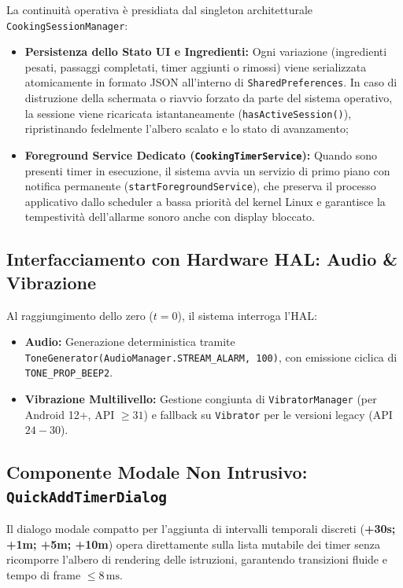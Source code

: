 \documentclass[11pt,a4paper,titlepage]{article}
\begin{document}
La continuit\`a operativa \`e presidiata dal singleton architetturale \texttt{CookingSessionManager}:
\begin{itemize}[leftmargin=*]
    \item \textbf{Persistenza dello Stato UI e Ingredienti:} Ogni variazione (ingredienti pesati, passaggi completati, timer aggiunti o rimossi) viene serializzata atomicamente in formato JSON all'interno di \texttt{SharedPreferences}. In caso di distruzione della schermata o riavvio forzato da parte del sistema operativo, la sessione viene ricaricata istantaneamente (\texttt{hasActiveSession()}), ripristinando fedelmente l'albero scalato e lo stato di avanzamento;
    \item \textbf{Foreground Service Dedicato (\texttt{CookingTimerService}):} Quando sono presenti timer in esecuzione, il sistema avvia un servizio di primo piano con notifica permanente (\texttt{startForegroundService}), che preserva il processo applicativo dallo scheduler a bassa priorit\`a del kernel Linux e garantisce la tempestivit\`a dell'allarme sonoro anche con display bloccato.
\end{itemize}

\subsection{Interfacciamento con Hardware HAL: Audio \& Vibrazione}
Al raggiungimento dello zero ($t = 0$), il sistema interroga l'HAL:
\begin{itemize}[leftmargin=*]
    \item \textbf{Audio:} Generazione deterministica tramite \texttt{ToneGenerator(AudioManager.STREAM\_ALARM, 100)}, con emissione ciclica di \texttt{TONE\_PROP\_BEEP2}.
    \item \textbf{Vibrazione Multilivello:} Gestione congiunta di \texttt{VibratorManager} (per Android 12+, API $\ge 31$) e fallback su \texttt{Vibrator} per le versioni legacy (API $24-30$).
\end{itemize}

\subsection{Componente Modale Non Intrusivo: \texttt{QuickAddTimerDialog}}
Il dialogo modale compatto per l'aggiunta di intervalli temporali discreti (\textbf{+30s; +1m; +5m; +10m}) opera direttamente sulla lista mutabile dei timer senza ricomporre l'albero di rendering delle istruzioni, garantendo transizioni fluide e tempo di frame $\le 8\,\text{ms}$.
\end{document}
